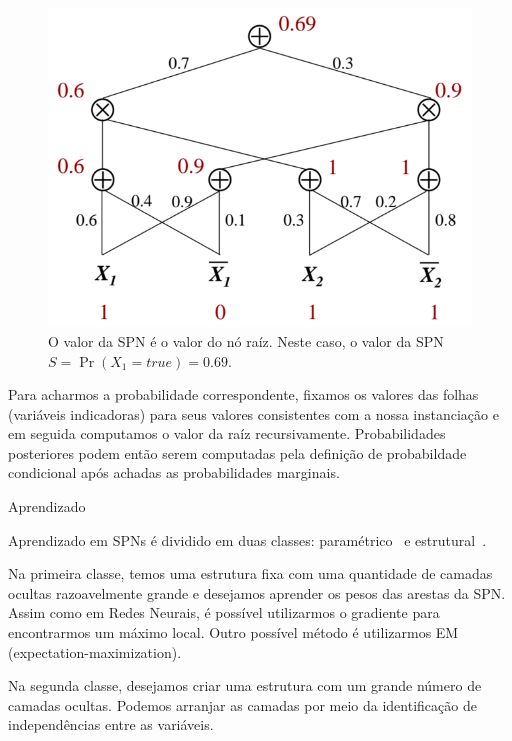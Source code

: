 \documentclass{amsart}
\makeatletter
\def\subsection{\@startsection{subsection}{3}%
  \z@{.5\linespacing\@plus.7\linespacing}{.1\linespacing}%
  {\normalfont\itshape}}
\theoremstyle{plain}
\numberwithin{equation}{subsection}
\makeatother
\begin{document}
\begin{figure}[h]
  \centering\includegraphics[scale=0.3]{imgs/marginals.png}
  \caption{O valor da SPN é o valor do nó raíz. Neste caso, o valor da SPN $S=\Pr(X_1=true)=0.69$.}
\end{figure}

Para acharmos a probabilidade correspondente, fixamos os valores das folhas (variáveis indicadoras)
para seus valores consistentes com a nossa instanciação e em seguida computamos o valor da raíz
recursivamente. Probabilidades posteriores podem então serem computadas pela definição de
probabildade condicional após achadas as probabilidades marginais.

\subsection{Aprendizado}

Aprendizado em SPNs é dividido em duas classes: paramétrico~\cite{poon-domingos} e
estrutural~\cite{gens-domingos}.

Na primeira classe, temos uma estrutura fixa com uma quantidade de camadas ocultas razoavelmente
grande e desejamos aprender os pesos das arestas da SPN\@. Assim como em Redes Neurais, é possível
utilizarmos o gradiente para encontrarmos um máximo local. Outro possível método é utilizarmos EM
(expectation-maximization).

Na segunda classe, desejamos criar uma estrutura com um grande número de camadas ocultas. Podemos
arranjar as camadas por meio da identificação de independências entre as variáveis.
\end{document}
